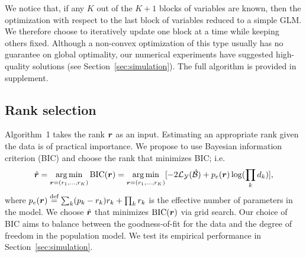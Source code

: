 \documentclass{article}
\theoremstyle{plain}
\theoremstyle{definition}
\begin{document}
We notice that, if any $K$ out of the $K+1$ blocks of variables are known, then the optimization with respect to the last block of variables reduced to a simple GLM. We therefore choose to iteratively update one block at a time while keeping others fixed. Although a non-convex optimization of this type usually has no guarantee on global optimality, our numerical experiments have suggested high-quality solutions (see Section~\ref{sec:simulation}). The full algorithm is provided in supplement. 
\vspace{-.2cm}
\subsection{Rank selection}\label{sec:tuning}
\vspace{-.2cm}
Algorithm~1 takes the rank $\bm{r}$ as an input. Estimating an appropriate rank given the data is of practical importance. We propose to use Bayesian information criterion (BIC) and choose the rank that minimizes BIC; i.e.
\begin{align}\label{eq:BIC}
\hat {\bm{r}}=\operatorname*{arg\,min}_{\bm{r}=(r_1,\ldots,r_K)} \text{BIC}(\bm{r}) =\operatorname*{arg\,min}_{\bm{r}=(r_1,\ldots,r_K)}[-2\mathcal{L}_{\mathcal{Y}}(\hat {\mathcal{B}})+p_e(\bm{r})\log (\prod_k d_k)],
\end{align}
where $p_e(\bm{r})\stackrel{\text{def}}{=}\sum_k (p_k-r_k)r_k+\prod_k r_k$ is the effective number of parameters in the model. We choose $\hat {\bm{r}}$ that minimizes $\text{BIC}(\bm{r})$ via grid search. Our choice of BIC aims to balance between the goodness-of-fit for the data and the degree of freedom in the population model. We test its empirical performance in Section~\ref{sec:simulation}.  


\vspace{-.2cm}
\end{document}

